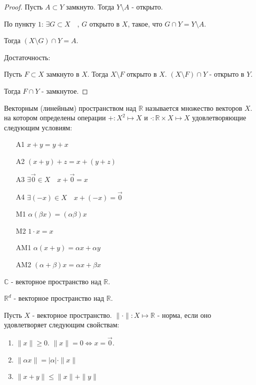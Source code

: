 \begin{theorem}
\begin{enumerate}
\begin{proof}
                Пусть $A \subset Y$ замкнуто. Тогда $Y \setminus A$ - открыто.

                По пункту $1$: $\exists{G \subset X}\quad $, $G$ открыто в $X$, такое, что $G\cap Y = Y \setminus A$.

                Тогда $(X\setminus G)\cap Y = A$.

                Достаточность:

                Пусть $F \subset X$ замкнуто в $X$. Тогда $X \setminus F$ открыто в $X$. $(X \setminus F)\cap Y$ - открыто в $Y$.

                Тогда $F\cap Y$ - замкнутое.
            \end{proof}
   \end{enumerate}
\end{theorem}
\begin{definition} \thmslashn 

    Векторным (линейным) пространством над $\mathbb{R}$ называется множество векторов $X$. на котором определены операции $+ : X^2 \mapsto X$ и $\cdot : \mathbb{R} \times X \mapsto X$ удовлетворяющие следующим условиям:

    \begin{enumerate}
        \item[A1] $x + y = y + x$
        \item[A2] $(x + y) + z = x + (y + z)$
        \item[A3]  $\exists{\vec{0}\in X}\quad x + \vec{0} = x$ 
        \item[A4] $\exists{(-x)\in X}\quad  x + (-x) = \vec{0}$ 
        \item[M1] $\alpha(\beta x) = (\alpha \beta) x$
        \item[M2] $1\cdot x = x$
        \item[AM1] $\alpha(x+y) = \alpha x + \alpha y$
        \item[AM2] $(\alpha + \beta)x = \alpha x + \beta x$
    \end{enumerate}
\end{definition}
\begin{example} \thmslashn

    $\mathbb{C}$ - векторное пространство над $\mathbb{R}$.

    $\mathbb{R}^{d}$ - векторное пространство над $\mathbb{R}$.
\end{example}
\begin{definition}[Норма] \thmslashn 

    Пусть $X$ - векторное пространство.  $\|\cdot\| : X \mapsto \mathbb{R}$ - норма, если оно удовлетворяет следующим свойствам:
    \begin{enumerate}
        \item $\| x \| \ge 0$. $ \| x \| = 0 \iff x = \vec{0}$.
        \item $ \| \alpha x \| = |\alpha| \cdot  \| x \| $
        \item $ \| x + y  \| \le  \| x  \|  +  \| y  \| $
    \end{enumerate}
\end{definition}
